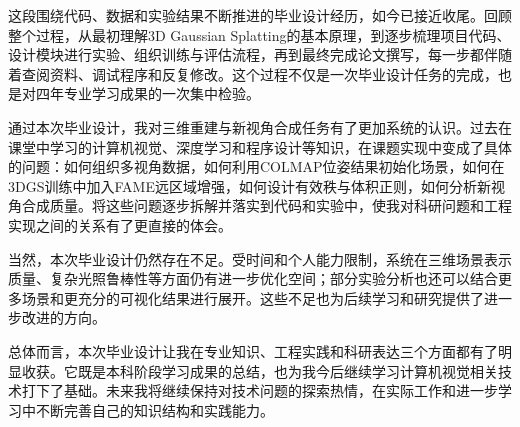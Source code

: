 
\begin{designsummary}
    这段围绕代码、数据和实验结果不断推进的毕业设计经历，如今已接近收尾。回顾整个过程，从最初理解3D Gaussian Splatting的基本原理，到逐步梳理项目代码、设计模块进行实验、组织训练与评估流程，再到最终完成论文撰写，每一步都伴随着查阅资料、调试程序和反复修改。这个过程不仅是一次毕业设计任务的完成，也是对四年专业学习成果的一次集中检验。
    
    通过本次毕业设计，我对三维重建与新视角合成任务有了更加系统的认识。过去在课堂中学习的计算机视觉、深度学习和程序设计等知识，在课题实现中变成了具体的问题：如何组织多视角数据，如何利用COLMAP位姿结果初始化场景，如何在3DGS训练中加入FAME远区域增强，如何设计有效秩与体积正则，如何分析新视角合成质量。将这些问题逐步拆解并落实到代码和实验中，使我对科研问题和工程实现之间的关系有了更直接的体会。
    
    当然，本次毕业设计仍然存在不足。受时间和个人能力限制，系统在三维场景表示质量、复杂光照鲁棒性等方面仍有进一步优化空间；部分实验分析也还可以结合更多场景和更充分的可视化结果进行展开。这些不足也为后续学习和研究提供了进一步改进的方向。
    
    总体而言，本次毕业设计让我在专业知识、工程实践和科研表达三个方面都有了明显收获。它既是本科阶段学习成果的总结，也为我今后继续学习计算机视觉相关技术打下了基础。未来我将继续保持对技术问题的探索热情，在实际工作和进一步学习中不断完善自己的知识结构和实践能力。
    \end{designsummary}
    